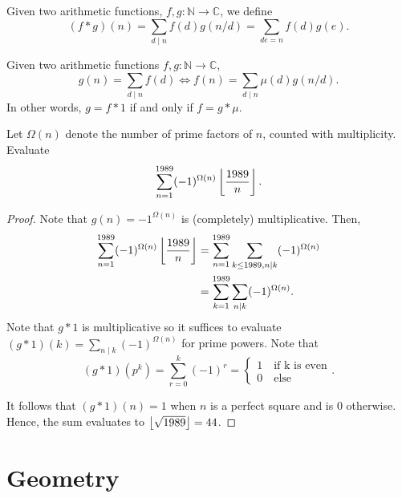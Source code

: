 \documentclass[11pt]{article}
\newcommand{\N}{\mathbb{N}}
\newcommand{\C}{\mathbb C}
\renewcommand{\>}{\rangle}
\newcommand{\<}{\langle}
\begin{document}
\begin{definition} Given two arithmetic functions, $f, g: \N \to \C$, we define 
$$(f * g)(n) = \sum_{d \mid n} f(d) g(n/d) = \sum_{de = n} f(d) g(e).$$
\end{definition}

\begin{theorem} Given two arithmetic functions $f, g: \N \to \C$, 
$$g(n) = \sum_{d \mid n} f(d) \Longleftrightarrow f(n) = \sum_{d  \mid n} \mu(d) g(n/d).$$
In other words, $g = f * 1$ if and only if $f = g * \mu$.
\end{theorem}

\begin{problem}[Bulgaria 1989] Let $\Omega(n)$ denote the number of prime factors of $n$, counted with multiplicity.  Evaluate 
$$\sum_{n=1}^{1989} (-1)^{\Omega(n)} \left\lfloor \frac{1989}{n} \right\rfloor.$$
\end{problem}
\begin{proof}
Note that $g(n) = -1^{\Omega(n)}$ is (completely) multiplicative.  Then,
\begin{align*}
\sum_{n=1}^{1989} (-1)^{\Omega(n)} \left\lfloor \frac{1989}{n} \right\rfloor &= \sum_{n=1}^{1989} \sum_{k \le 1989, n \mid k}  (-1)^{\Omega(n)} \\
&= \sum_{k=1}^{1989} \sum_{n \mid k} (-1)^{\Omega(n)}.
\end{align*}
Note that $g * 1$ is multiplicative so it suffices to evaluate $(g * 1)(k) = \sum_{n \mid k} (-1)^{\Omega(n)}$ for prime powers.  Note that 
$$(g*1)(p^k) = \sum_{r=0}^k (-1)^{r} = \begin{cases}
1 \quad \text{if k is even}\\
0 \quad \text{else}
\end{cases}.$$

It follows that $(g*1)(n) = 1$ when $n$ is a perfect square and is $0$ otherwise.  Hence, the sum evaluates to $\left\lfloor \sqrt{1989} \right\rfloor = 44$.
\end{proof} 
\pagebreak
\section{Geometry}
\end{document}
